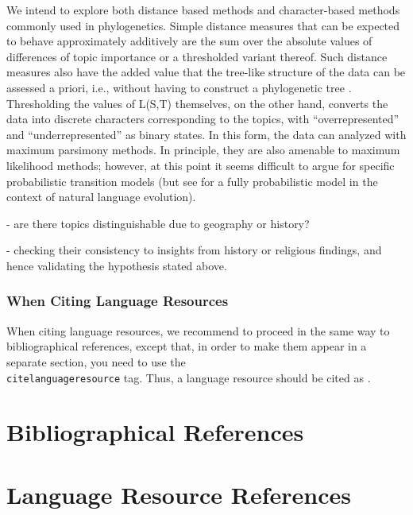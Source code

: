 \documentclass[a4paper,10pt]{article}
\newcommand{\TODO}[1]{\begingroup\color{red}#1\endgroup}
\begin{document}
We intend to explore both distance based methods and character-based methods commonly 
used in phylogenetics. Simple distance measures that can be expected to behave approximately
additively are the sum over the absolute values of differences of topic importance or a 
thresholded variant thereof. Such distance measures also have the added value that the 
tree-like structure of the data can be assessed a priori, i.e., without having to construct 
a phylogenetic tree \cite{Misof:14}. Thresholding the values of L(S,T) themselves, on the other 
hand, converts the data into discrete characters corresponding to the topics, with 
``overrepresented'' and ``underrepresented''  as binary states. In this form, the data can 
analyzed with maximum parsimony methods. In principle, they are also amenable to maximum 
likelihood methods; however, at this point it seems difficult to argue for specific 
probabilistic transition models (but see \cite{Hruschka:15} for a fully probabilistic model in 
the context of natural language evolution).



\TODO{- are there topics distinguishable due to geography or history?}

\TODO{- checking their consistency to insights from history or religious findings, and hence validating the hypothesis stated above.}

\subsubsection{When Citing Language Resources}

When citing language resources, we recommend to proceed in the same way to
bibliographical references, except that, in order to make them appear in
a separate section, you need to use the \texttt{\\citelanguageresource} tag.
Thus, a language resource should be cited as .



\section{Bibliographical References}
\label{main:ref}





\section{Language Resource References}
\label{lr:ref}
\end{document}
